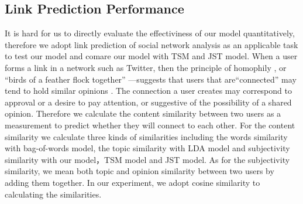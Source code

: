\documentclass[runningheads,a4paper]{llncs}
\begin{document}
\subsection{Link Prediction Performance}
It is hard for us to directly evaluate the effectiviness of our model quantitatively, therefore we adopt link prediction of social network analysis as an applicable task to test our model and comare our model with TSM and JST model. When a user forms a link in a network such as Twitter, then the principle of homophily \cite{lazarsfeld_friendship_1954}, or ``birds of a feather flock together'' \cite{mcpherson2001birds} —suggests that users that are``connected'' may tend to hold similar opinions \cite{thelwall2010emotion}. The connection a user creates may correspond to approval or a desire to pay attention, or suggestive of the possibility of a shared opinion. Therefore we calculate the content similarity between two users as a measurement to predict whether they will connect to each other. For the content similarity we calculate three kinds of similarities including the words similarity with bag-of-words model, the topic similarity with LDA model and subjectivity similarity with our model，TSM model and JST model. As for the subjectivity similarity, we mean both topic and opinion similarity between two users by adding them together. In our experiment, we adopt cosine similarity to calculating the similarities.
\end{document}
